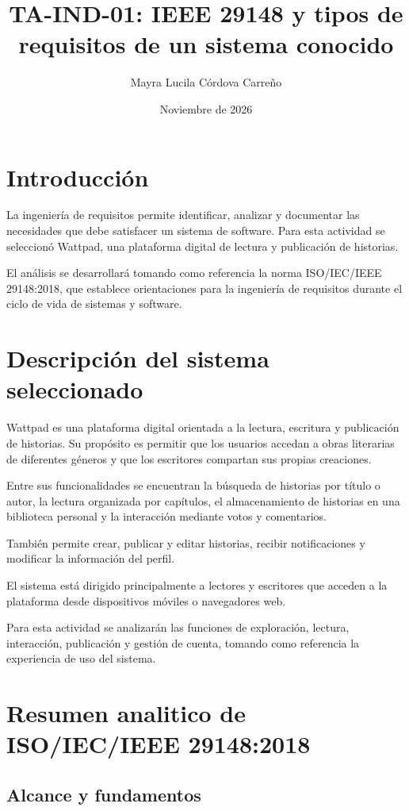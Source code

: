 \documentclass[11pt,a4paper]{article}
\title{TA-IND-01: IEEE 29148 y tipos de requisitos de un sistema conocido}
\author{Mayra Lucila Córdova Carreño}
\date{Noviembre de 2026}
\begin{document}
\maketitle

\section{Introducción}

La ingeniería de requisitos permite identificar,
analizar y documentar las necesidades que debe
satisfacer un sistema de software. Para esta
actividad se seleccionó Wattpad, una plataforma
digital de lectura y publicación de historias.

El análisis se desarrollará tomando como
referencia la norma ISO/IEC/IEEE 29148:2018,
que establece orientaciones para la ingeniería
de requisitos durante el ciclo de vida de
sistemas y software.

\section{Descripción del sistema seleccionado}

Wattpad es una plataforma digital orientada
a la lectura, escritura y publicación de
historias. Su propósito es permitir que los
usuarios accedan a obras literarias de
diferentes géneros y que los escritores
compartan sus propias creaciones.

Entre sus funcionalidades se encuentran la
búsqueda de historias por título o autor,
la lectura organizada por capítulos,
el almacenamiento de historias en una
biblioteca personal y la interacción mediante
votos y comentarios.

También permite crear, publicar y editar
historias, recibir notificaciones y modificar
la información del perfil.

El sistema está dirigido principalmente a
lectores y escritores que acceden a la
plataforma desde dispositivos móviles o
navegadores web.

Para esta actividad se analizarán las
funciones de exploración, lectura,
interacción, publicación y gestión de cuenta,
tomando como referencia la experiencia
de uso del sistema.


\section{Resumen analitico de ISO/IEC/IEEE 29148:2018}\cite{ieee29148}

\subsection{Alcance y fundamentos}
\end{document}
